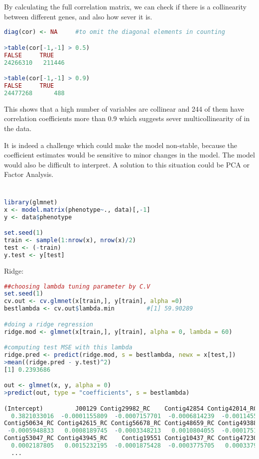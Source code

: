 \documentclass[11pt]{article}
\begin{document}
\section{}
By calculating the full correlation matrix, we can check if there is a collinearity between different genes, and also how sever it is.
\begin{lstlisting}[language=R, breaklines=true, basicstyle=\ttfamily]
diag(cor) <- NA		#to omit the diagonal elements in counting

>table(cor[-1,-1] > 0.5)
FALSE     TRUE 
24266310   211446

>table(cor[-1,-1] > 0.9)
FALSE     TRUE 
24477268      488
\end{lstlisting}
This shows that a high number of variables are collinear and 244 of them have correlation coefficients more than 0.9 which suggests sever multicollinearity of in the data.

It is indeed a challenge which could make the model non-stable, because the coefficient estimates would be sensitive to minor changes in the model. The model would also be difficult to interpret.
A solution to this situation could be PCA or Factor Analysis.

\section{}
\begin{lstlisting}[language=R, breaklines=true, basicstyle=\ttfamily]
library(glmnet)
x <- model.matrix(phenotype~., data)[,-1]
y <- data$phenotype

set.seed(1)
train <- sample(1:nrow(x), nrow(x)/2)
test <- (-train)
y.test <- y[test]
\end{lstlisting}

Ridge:
\begin{lstlisting}[language=R, breaklines=true, basicstyle=\ttfamily]
##choosing lambda tuning parameter by C.V
set.seed(1)
cv.out <- cv.glmnet(x[train,], y[train], alpha =0)
bestlambda <- cv.out$lambda.min         #[1] 59.90289

#doing a ridge regression
ridge.mod <- glmnet(x[train,], y[train], alpha = 0, lambda = 60)

#computing test MSE with this lambda
ridge.pred <- predict(ridge.mod, s = bestlambda, newx = x[test,])
>mean((ridge.pred - y.test)^2)
[1] 0.2393686

out <- glmnet(x, y, alpha = 0)
>predict(out, type = "coefficients", s = bestlambda)

(Intercept)         J00129 Contig29982_RC    Contig42854 Contig42014_RC Contig27915_RC Contig20156_RC 
  0.3821033016  -0.0001155809  -0.0007157701  -0.0006814239  -0.0011455571  -0.0008669318  -0.0012960925 
Contig50634_RC Contig42615_RC Contig56678_RC Contig48659_RC Contig49388_RC  Contig1970_RC Contig26343_RC 
 -0.0005948833   0.0008189745  -0.0003348213   0.0010804055  -0.0001751950   0.0001944577  -0.0007462841 
Contig53047_RC Contig43945_RC    Contig19551 Contig10437_RC Contig47230_RC Contig20749_RC 
  0.0002187805   0.0015232195  -0.0001875428  -0.0003775705   0.0003379700  -0.0008755412
  ...
\end{lstlisting}
\end{document}
